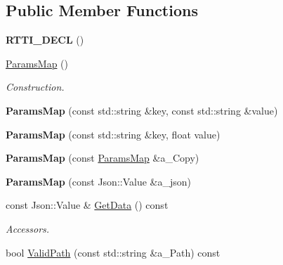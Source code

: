 \subsection*{Public Member Functions}
\begin{DoxyCompactItemize}
\item 
\mbox{\label{class_params_map_a9a87f25b3a6f420ff53bef6a36aebc55}} 
{\bfseries R\+T\+T\+I\+\_\+\+D\+E\+CL} ()
\item 
\mbox{\label{class_params_map_a8d606a7d84a804e9480dbbc1806b29df}} 
\hyperlink{class_params_map_a8d606a7d84a804e9480dbbc1806b29df}{Params\+Map} ()
\begin{DoxyCompactList}\small\item\em Construction. \end{DoxyCompactList}\item 
\mbox{\label{class_params_map_a1c0d524f21b882a0f60aefa47482fdcf}} 
{\bfseries Params\+Map} (const std\+::string \&key, const std\+::string \&value)
\item 
\mbox{\label{class_params_map_a5f59c2e240f03e00084c50712ba67d18}} 
{\bfseries Params\+Map} (const std\+::string \&key, float value)
\item 
\mbox{\label{class_params_map_a30a9f6dedd69a729dc6d2cde7d12132b}} 
{\bfseries Params\+Map} (const \hyperlink{class_params_map}{Params\+Map} \&a\+\_\+\+Copy)
\item 
\mbox{\label{class_params_map_acf03415d122ef3d6bef1716086cd53aa}} 
{\bfseries Params\+Map} (const Json\+::\+Value \&a\+\_\+json)
\item 
\mbox{\label{class_params_map_a802b5d358b1db32e8a553e47b1c59517}} 
const Json\+::\+Value \& \hyperlink{class_params_map_a802b5d358b1db32e8a553e47b1c59517}{Get\+Data} () const
\begin{DoxyCompactList}\small\item\em Accessors. \end{DoxyCompactList}\item 
\mbox{\label{class_params_map_affbb8dc9d2ebcac706a1cce064a047ee}} 
bool \hyperlink{class_params_map_affbb8dc9d2ebcac706a1cce064a047ee}{Valid\+Path} (const std\+::string \&a\+\_\+\+Path) const

\end{DoxyCompactItemize}
